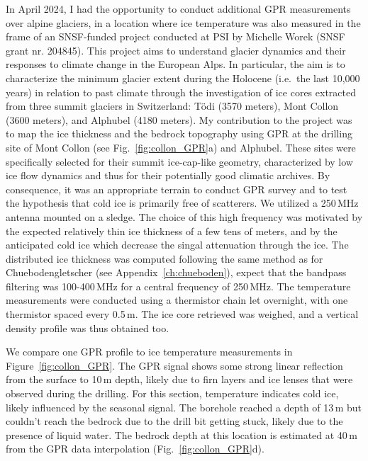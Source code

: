 In April 2024, I had the opportunity to conduct additional GPR measurements over alpine glaciers, in a location where ice temperature was also measured in the frame of an SNSF-funded project conducted at PSI by Michelle Worek (SNSF grant nr. 204845). This project aims to understand glacier dynamics and their responses to climate change in the European Alps. In particular, the aim is to characterize the minimum glacier extent during the Holocene (i.e.\ the last 10,000 years) in relation to past climate through the investigation of ice cores extracted from three summit glaciers in Switzerland: Tödi (3570 meters), Mont Collon (3600 meters), and Alphubel (4180 meters). My contribution to the project was to map the ice thickness and the bedrock topography using GPR at the drilling site of Mont Collon (see Fig.~\ref{fig:collon_GPR}a) and Alphubel. These sites were specifically selected for their summit ice-cap-like geometry, characterized by low ice flow dynamics and thus for their potentially good climatic archives. By consequence, it was an appropriate terrain to conduct GPR survey and to test the hypothesis that cold ice is primarily free of scatterers. We utilized a 250\,MHz antenna mounted on a sledge. The choice of this high frequency was motivated by the expected relatively thin ice thickness of a few tens of meters, and by the anticipated cold ice which decrease the singal attenuation through the ice. The distributed ice thickness was computed following the same method as for Chuebodengletscher (see Appendix~\ref{ch:chueboden}), expect that the bandpass filtering was 100-400\,MHz for a central frequency of 250\,MHz. The temperature measurements were conducted using a thermistor chain let overnight, with one thermistor spaced every 0.5\,m. The ice core retrieved was weighed, and a vertical density profile was thus obtained too.

We compare one GPR profile to ice temperature measurements in Figure~\ref{fig:collon_GPR}. The GPR signal shows some strong linear reflection from the surface to 10\,m depth, likely due to firn layers and ice lenses that were observed during the drilling. For this section, temperature indicates cold ice, likely influenced by the seasonal signal. The borehole reached a depth of 13\,m but couldn't reach the bedrock due to the drill bit getting stuck, likely due to the presence of liquid water. The bedrock depth at this location is estimated at 40\,m from the GPR data interpolation (Fig.~\ref{fig:collon_GPR}d).

